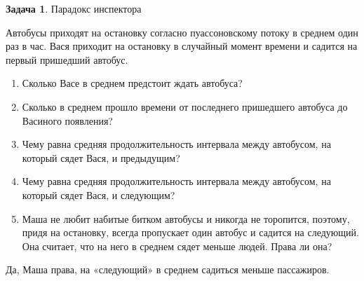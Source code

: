 \documentclass[nobib]{tufte-handout}
\theoremstyle{definition}
\newtheorem{problem}{Задача}
\begin{document}
\begin{problem}
Парадокс инспектора

Автобусы приходят на остановку согласно пуассоновскому потоку в среднем один раз в час. Вася приходит на остановку в случайный момент времени и садится на первый пришедший автобус.

\begin{enumerate}
\item Сколько Васе в среднем предстоит ждать автобуса?
\item Сколько в среднем прошло времени от последнего пришедшего автобуса до Васиного появления?
\item Чему равна средняя продолжительность интервала между автобусом, на который сядет Вася, и предыдущим?
\item Чему равна средняя продолжительность интервала между автобусом, на который сядет Вася, и следующим?
\item Маша не любит набитые битком автобусы и никогда не торопится, поэтому, придя на остановку, всегда пропускает один автобус и садится на следующий. Она считает, что на него в среднем сядет меньше людей. Права ли она?
\end{enumerate}


\begin{sol}
Да, Маша права, на «следующий» в среднем садиться меньше пассажиров.
\end{sol}

\end{problem}
\end{document}
